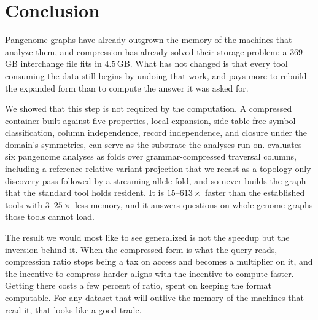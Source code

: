 \section{Conclusion}
\label{sec:conclusion}

Pangenome graphs have already outgrown the memory of the machines that analyze
them, and compression has already solved their storage problem: a $369$\,GB
interchange file fits in $4.5$\,GB. What has not changed is that every tool
consuming the data still begins by undoing that work, and pays more to rebuild the
expanded form than to compute the answer it was asked for.

We showed that this step is not required by the computation. A compressed
container built against five properties, local expansion, side-table-free symbol
classification, column independence, record independence, and closure under the
domain's symmetries, can serve as the substrate the analyses run on. \sys
evaluates six pangenome analyses as folds over grammar-compressed traversal
columns, including a reference-relative variant projection that we recast as a
topology-only discovery pass followed by a streaming allele fold, and so never
builds the graph that the standard tool holds resident. It is $15$--$613\times$
faster than the established tools with $3$--$25\times$ less memory, and it answers
questions on whole-genome graphs those tools cannot load.

The result we would most like to see generalized is not the speedup but the
inversion behind it. When the compressed form is what the query reads, compression
ratio stops being a tax on access and becomes a multiplier on it, and the incentive
to compress harder aligns with the incentive to compute faster. Getting there costs
a few percent of ratio, spent on keeping the format computable. For any dataset
that will outlive the memory of the machines that read it, that looks like a good
trade.
